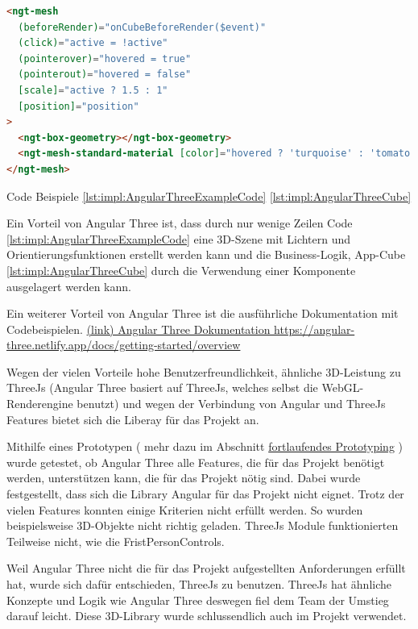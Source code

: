 \begin{lstlisting}[language=html,caption=Angular Three - App Cube,label=lst:impl:AngularThreeCube]
<ngt-mesh
  (beforeRender)="onCubeBeforeRender($event)"
  (click)="active = !active"
  (pointerover)="hovered = true"
  (pointerout)="hovered = false"
  [scale]="active ? 1.5 : 1"
  [position]="position"
>
  <ngt-box-geometry></ngt-box-geometry>
  <ngt-mesh-standard-material [color]="hovered ? 'turquoise' : 'tomato'"></ngt-mesh-standard-material>
</ngt-mesh>
\end{lstlisting}

Code Beispiele \ref{lst:impl:AngularThreeExampleCode} \ref{lst:impl:AngularThreeCube} \cite{AngularThreeDocumentationFirstScene}

Ein Vorteil von Angular Three ist, dass durch nur wenige Zeilen Code \ref{lst:impl:AngularThreeExampleCode} eine 3D-Szene mit Lichtern und Orientierungsfunktionen erstellt werden kann und die Business-Logik, App-Cube \ref{lst:impl:AngularThreeCube} durch die Verwendung einer Komponente ausgelagert werden kann.

Ein weiterer Vorteil von Angular Three ist die ausführliche Dokumentation mit Codebeispielen. \href{https://angular-three.netlify.app/docs/getting-started/overview}{(link) Angular Three Dokumentation https://angular-three.netlify.app/docs/getting-started/overview}

Wegen der vielen Vorteile hohe Benutzerfreundlichkeit, ähnliche 3D-Leistung zu ThreeJs (Angular Three basiert auf ThreeJs, welches selbst die WebGL-Renderengine benutzt) und wegen der Verbindung von Angular und ThreeJs Features bietet sich die Liberay für das Projekt an.

Mithilfe eines Prototypen ( mehr dazu im Abschnitt \hyperref[ch::ongoing-prototyping]{fortlaufendes Prototyping} ) wurde getestet, ob Angular Three alle Features, die für das Projekt benötigt werden, unterstützen kann, die für das Projekt nötig sind. Dabei wurde festgestellt, dass sich die Library Angular für das Projekt nicht eignet. Trotz der vielen Features konnten einige Kriterien nicht erfüllt werden. So wurden beispielsweise 3D-Objekte nicht richtig geladen. ThreeJs Module funktionierten Teilweise nicht, wie die FristPersonControls. 

Weil Angular Three nicht die für das Projekt aufgestellten Anforderungen erfüllt hat, wurde sich dafür entschieden, ThreeJs zu benutzen. ThreeJs hat ähnliche Konzepte und Logik wie Angular Three deswegen fiel dem Team der Umstieg darauf leicht. Diese 3D-Library wurde schlussendlich auch im Projekt verwendet.